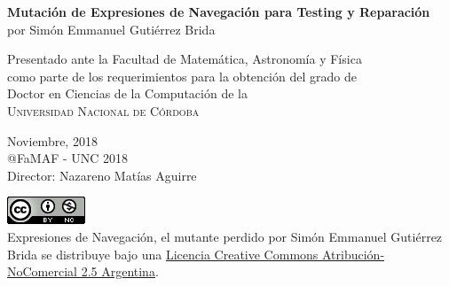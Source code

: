 \begin{titlepage}

\begin{center}
{\LARGE \textbf{Mutaci\'on de Expresiones de Navegaci\'on para Testing y Reparaci\'on}}\\ 
\vspace{4mm}
{\Large por Sim\'on Emmanuel Guti\'errez Brida}\\

\vspace{50mm}

Presentado ante la Facultad de Matem\'atica, Astronom\'ia y F\'isica\\
como parte de los requerimientos para la obtenci\'on del grado de\\
Doctor en Ciencias de la Computaci\'on de la\\
\textsc{Universidad Nacional de C\'ordoba}\\
 
\vspace{50mm}

Noviembre, 2018\\
@FaMAF - UNC 2018\\
{\Large Director: Nazareno Mat\'ias Aguirre}

\vspace{10mm}
\href{https://i.creativecommons.org/l/by-nc/2.5/ar/88x31.png}{\includegraphics{images/licencia-famaf.png}}\\
{Expresiones de Navegaci\'on, el mutante perdido por Sim\'on Emmanuel Guti\'errez Brida se distribuye bajo una \href{http://creativecommons.org/licenses/by-nc/2.5/ar/}{Licencia Creative Commons Atribuci\'on-NoComercial 2.5 Argentina}.}
\end{center}  
\end{titlepage} 



